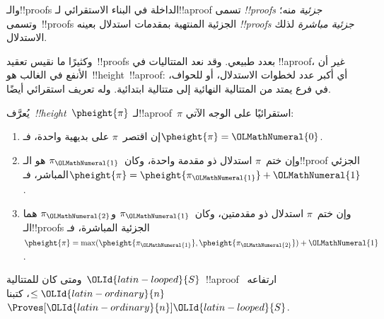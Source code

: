 \documentclass[../../../include/open-logic-section]{subfiles}
\begin{document}
والـ!!{proof}s الداخلة في البناء الاستقرائي لـ!!a{proof} تسمى
\emph{!!{proof}s جزئية} منه؛ وتسمى~!!{proof}s الجزئية المنتهية بمقدمات استدلال بعينه
\emph{!!{proof}s جزئية مباشرة} لذلك الاستدلال.

وكثيرًا ما نقيس تعقيد~!!{proof}s بعدد طبيعي. وقد نعد المتتاليات في
!!a{proof}، غير أن الأنفع في الغالب هو~!!{height}~!!a{proof}: أي أكبر
عدد لخطوات الاستدلال، أو للحواف، في فرع يمتد من المتتالية النهائية إلى
متتالية ابتدائية. وله تعريف استقرائي أيضًا.

\begin{defn}
يُعرَّف~\emph{!!{height}}~$\pheight{\pi}$ لـ!!a{proof}~$\pi$ استقرائيًا
على الوجه الآتي:
\begin{enumerate}
  \item إن اقتصر~$\pi$ على بديهية واحدة، فـ$\pheight{\pi}={\OLMathNumeral{0}}$.
  \item وإن ختم~$\pi$ استدلال ذو مقدمة واحدة، وكان~$\pi_{\OLMathNumeral{1}}$ هو
  الـ!!{proof} الجزئي المباشر، فـ$\pheight{\pi}=\pheight{\pi_{\OLMathNumeral{1}}}+{\OLMathNumeral{1}}$.
  \item وإن ختم~$\pi$ استدلال ذو مقدمتين، وكان~$\pi_{\OLMathNumeral{1}}$ و$\pi_{\OLMathNumeral{2}}$
  هما الـ!!{proof}s الجزئية المباشرة، فـ
  $\pheight{\pi}=\max(\pheight{\pi_{\OLMathNumeral{1}}},\pheight{\pi_{\OLMathNumeral{2}}})+{\OLMathNumeral{1}}$.
\end{enumerate}
ومتى كان للمتتالية~${\OLId{latin-looped}{S}}$~!!a{proof} ارتفاعه~$\le {\OLId{latin-ordinary}{n}}$، كتبنا~$\Proves[{\OLId{latin-ordinary}{n}}]{\OLId{latin-looped}{S}}$.
\end{defn}
\end{document}

